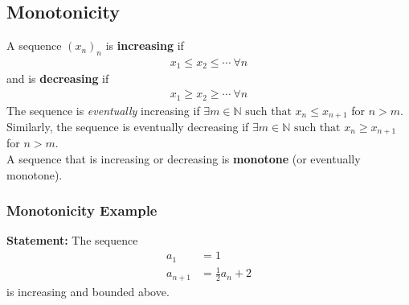 \documentclass[10pt]{extarticle}
\newcommand{\N}{\mathbb{N}}
\begin{document}
    \subsection{Monotonicity}%
    A sequence $(x_n)_n$ is \textbf{increasing} if
    \begin{align*}
      x_1 \leq x_2 \leq \cdots~\forall n
    \end{align*}
    and is \textbf{decreasing} if
    \begin{align*}
      x_1 \geq x_2 \geq \cdots~\forall n
    \end{align*}
    The sequence is \textsl{eventually} increasing if $\exists m\in \N \text{ such that } x_n \leq x_{n+1}$ for $n > m$.\\

    Similarly, the sequence is eventually decreasing if $\exists m\in\N \text{ such that } x_n \geq x_{n+1}$ for $n > m$.\\

    A sequence that is increasing or decreasing is \textbf{monotone} (or eventually monotone).
    \subsubsection{Monotonicity Example}%
    \textbf{Statement:} The sequence
    \begin{align*}
      a_1 &= 1\\
      a_{n+1} &= \frac{1}{2}a_n + 2
    \end{align*}
    is increasing and bounded above.\\
\end{document}
